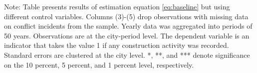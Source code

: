 \begin{table}[htbp]
\begin{tabular}{lccccc}
      
   \end{tabular}
   
   \par \raggedright 
   Note: Table presents results of estimation equation \eqref{eq:baseline} but using different control variables. Columns (3)-(5) drop observations with missing data on conflict incidents from the sample. Yearly data was aggregated into periods of 50 years. Observations are at the city-period level. The dependent variable is an  indicator that takes the value 1 if any construction activity was recorded.  Standard errors are clustered at the city level. *, **, and *** denote significance on the 10 percent, 5 percent, and 1 percent  level, respectively.
\end{table}
